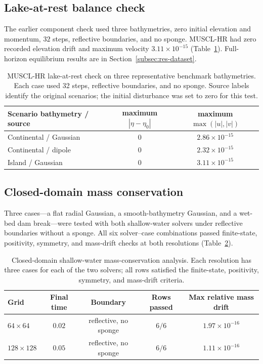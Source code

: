 \subsection{Lake-at-rest balance check}
\label{app:lake-at-rest}

The earlier component check used three bathymetries, zero initial elevation and momentum, $32$ steps, reflective boundaries, and no sponge. MUSCL-HR had zero recorded elevation drift and maximum velocity $3.11\times10^{-15}$ (Table~\ref{tab:app-lake-at-rest}). Full-horizon equilibrium results are in Section~\ref{subsec:res-dataset}.

\begin{table}[pos=!htbp]
\centering
\caption{MUSCL-HR lake-at-rest check on three representative benchmark bathymetries. Each case used 32 steps, reflective boundaries, and no sponge. Source labels identify the original scenarios; the initial disturbance was set to zero for this test.}
\label{tab:app-lake-at-rest}
\begin{tabular}{lcc}
    \toprule
    Scenario bathymetry / source & maximum $|\eta-\eta_0|$ & maximum $\max(|u|,|v|)$ \\
    \midrule
    Continental / Gaussian & $0$ & $2.86 \times 10^{-15}$ \\
    Continental / dipole & $0$ & $2.32 \times 10^{-15}$ \\
    Island / Gaussian & $0$ & $3.11 \times 10^{-15}$ \\
    \bottomrule
\end{tabular}
\end{table}

\FloatBarrier
\subsection{Closed-domain mass conservation}
\label{app:mass-conservation}

Three cases---a flat radial Gaussian, a smooth-bathymetry Gaussian, and a wet-bed dam break---were tested with both shallow-water solvers under reflective boundaries without a sponge. All six solver--case combinations passed finite-state, positivity, symmetry, and mass-drift checks at both resolutions (Table~\ref{tab:app-mass-conservation}).

\begin{table}[pos=!htbp]
\centering
\caption{Closed-domain shallow-water mass-conservation analysis. Each resolution has three cases for each of the two solvers; all rows satisfied the finite-state, positivity, symmetry, and mass-drift criteria.}
\label{tab:app-mass-conservation}
\begin{tabular}{lcccc}
    \toprule
    Grid & Final time & Boundary & Rows passed & Max relative mass drift \\
    \midrule
    $64 \times 64$ & $0.02$ & reflective, no sponge & $6/6$ & $1.97 \times 10^{-16}$ \\
    $128 \times 128$ & $0.05$ & reflective, no sponge & $6/6$ & $1.11 \times 10^{-16}$ \\
    \bottomrule
\end{tabular}
\end{table}


